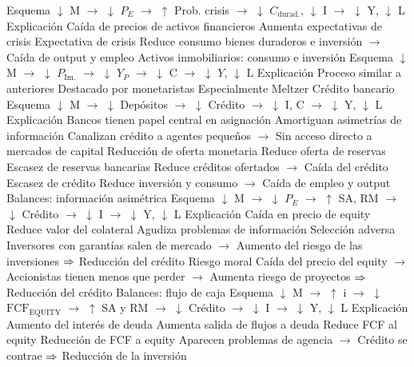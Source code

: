 \documentclass{nuevotema}
\begin{document}
\begin{esquemal}
			\3 Esquema
				\4[] $\downarrow$ M $\to$ $\downarrow$ $P_E$ $\to$ $\uparrow$ Prob. crisis $\to$ $\downarrow$ $C_\text{durad.}$, $\downarrow$ I $\to$ $\downarrow$ Y, $\downarrow$ L
			\3 Explicación
				\4 Caída de precios de activos financieros
				\4[] Aumenta expectativas de crisis
				\4 Expectativa de crisis
				\4[] Reduce consumo bienes duraderos e inversión
				\4[] $\to$ Caída de output y empleo
		\2 Activos inmobiliarios: consumo e inversión
			\3 Esquema
				\4[] $\downarrow$ M $\to$ $\downarrow$ $P_\text{Im.}$ $\to$ $\downarrow$ $Y_P$ $\to$ $\downarrow$ C $\to$ $\downarrow$ $Y$, $\downarrow$ L
			\3 Explicación
				\4 Proceso similar a anteriores
				\4 Destacado por monetaristas
				\4[] Especialmente Meltzer
		\2 Crédito bancario
			\3 Esquema
				\4[] $\downarrow$ M $\to$ $\downarrow$ Depósitos $\to$ $\downarrow$ Crédito $\to$ $\downarrow$ I, C $\to$ $\downarrow$ Y, $\downarrow$ L
			\3 Explicación
				\4 Bancos tienen papel central en asignación
				\4[] Amortiguan asimetrías de información
				\4[] Canalizan crédito a agentes pequeños
				\4[] $\to$ Sin acceso directo a mercados de capital
				\4 Reducción de oferta monetaria
				\4[] Reduce oferta de reservas
				\4 Escasez de reservas bancarias
				\4[] Reduce créditos ofertados
				\4[] $\to$ Caída del crédito
				\4 Escasez de crédito
				\4[] Reduce inversión y consumo
				\4[] $\to$ Caída de empleo y output
		\2 Balances: información asimétrica
			\3 Esquema
				\4[] $\downarrow$ M $\to$ $\downarrow$ $P_E$ $\to$ $\uparrow$ SA, RM $\to$ $\downarrow$ Crédito $\to$ $\downarrow$ I $\to$ $\downarrow$ Y, $\downarrow$ L
			\3 Explicación
				\4 Caída en precio de equity
				\4[] Reduce valor del colateral
				\4[] Agudiza problemas de información
				\4 Selección adversa
				\4[] Inversores con garantías salen de mercado
				\4[] $\to$ Aumento del riesgo de las inversiones
				\4[] $\Rightarrow$ Reducción del crédito
				\4 Riesgo moral
				\4[] Caída del precio del equity
				\4[] $\to$ Accionistas tienen menos que perder
				\4[] $\to$ Aumenta riesgo de proyectos
				\4[] $\Rightarrow$ Reducción del crédito
		\2 Balances: flujo de caja
			\3 Esquema
				\4[] $\downarrow$ M $\to$ $\uparrow$ i $\to$ $\downarrow$ $\text{FCF}_\text{EQUITY}$ $\to$ $\uparrow$ SA y RM $\to$ $\downarrow$ Crédito $\to$ $\downarrow$ I $\to$ $\downarrow$ Y, $\downarrow$ L
			\3 Explicación
				\4 Aumento del interés de deuda
				\4[] Aumenta salida de flujos a deuda
				\4[] Reduce FCF al equity
				\4 Reducción de FCF a equity
				\4[] Aparecen problemas de agencia
				\4[] $\to$ Crédito se contrae
				\4[] $\Rightarrow$ Reducción de la inversión

\end{esquemal}
\end{document}
